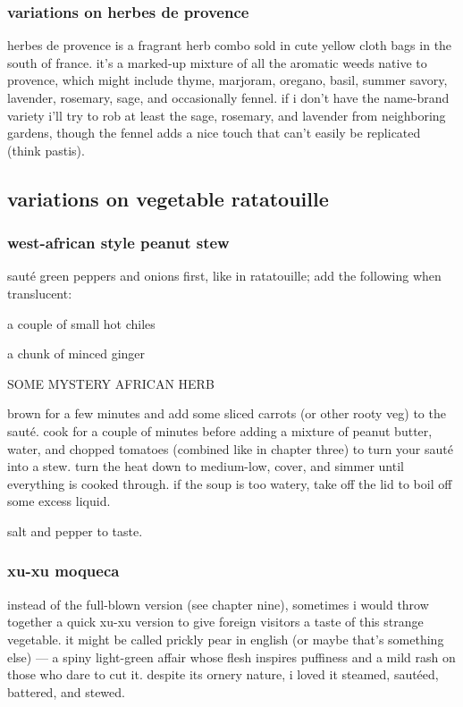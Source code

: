 \subsubsection{variations on herbes de provence}

herbes de provence is a fragrant herb combo sold in cute yellow cloth bags in 
the south of france. it's a marked-up mixture of all the aromatic weeds native 
to provence, which might include thyme, marjoram, oregano, basil, summer 
savory, lavender, rosemary, sage, and occasionally fennel. if i don't have the 
name-brand variety i'll try to rob at least the sage, rosemary, and lavender 
from neighboring gardens, though the fennel adds a nice touch that can't 
easily be replicated (think pastis).


\subsection{variations on vegetable ratatouille}

\subsubsection{west-african style peanut stew}

saut\'{e} green peppers and onions first, like in ratatouille; add the 
following when translucent:

\begin{ingredients}
  \item a couple of small hot chiles
  \item a chunk of minced ginger
  \item SOME MYSTERY AFRICAN HERB
\end{ingredients}
	
brown for a few minutes and add some sliced carrots (or other rooty veg) to 
the saut\'{e}. cook for a couple of minutes before adding a mixture of peanut 
butter, water, and chopped tomatoes (combined like in chapter three) to turn 
your saut\'{e} into a stew. turn the heat down to medium-low, cover, and 
simmer until everything is cooked through. if the soup is too watery, take off 
the lid to boil off some excess liquid.

salt and pepper to taste.

\subsubsection{xu-xu moqueca}

instead of the full-blown version (see chapter nine), sometimes i would throw 
together a quick xu-xu version to give foreign visitors a taste of this 
strange vegetable. it might be called prickly pear in english (or maybe that's 
something else) --- a spiny light-green affair whose flesh inspires puffiness 
and a mild rash on those who dare to cut it. despite its ornery nature, i 
loved it steamed, saut\'{e}ed, battered, and stewed.

